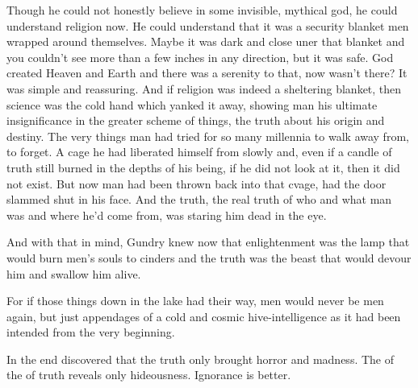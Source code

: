 {%
  Though he could not honestly believe in some invisible, mythical god, he could understand religion now.
  He could understand that it was a security blanket men wrapped around themselves.
  Maybe it was dark and close uner that blanket and you couldn't see more than a few inches in any direction, but it was safe.
  God created Heaven and Earth and there was a serenity to that, now wasn't there?
  It was simple and reassuring.
  And if religion was indeed a sheltering blanket, then science was the cold hand which yanked it away, showing man his ultimate insignificance in the greater scheme of things, the truth about his origin and destiny.
  The very things man had tried for so many millennia to walk away from, to forget.
  A cage he had liberated himself from slowly and, even if a candle of truth still burned in the depths of his being, if he did not look at it, then it did not exist. 
  But now man had been thrown back into that cvage, had the door slammed shut in his face.
  And the truth, the real truth of who and what man was and where he'd come from, was staring him dead in the eye. 
  
  And with that in mind, Gundry knew now that enlightenment was the lamp that would burn men's souls to cinders and the truth was the beast that would devour him and swallow him alive. 
  
  For if those things down in the lake had their way, men would never be men again, but just appendages of a cold and cosmic hive-intelligence as it had been intended from the very beginning. 
}

In the end \Kimon discovered that the truth only brought horror and madness. 
The  of the  of truth reveals only hideousness. 
Ignorance is better. 


